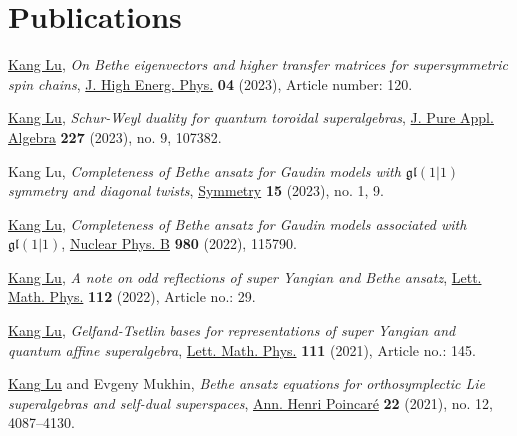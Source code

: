 \documentclass[11pt,letterpaper,roman%
]{moderncv}
\begin{document}
\section{Publications}

\begin{etaremune}[leftmargin=1cm]
\item \underline{Kang Lu}, {\textit{On Bethe eigenvectors and higher transfer matrices for supersymmetric spin chains}}, \href{https://doi.org/10.1007/JHEP04(2023)120}{J. High Energ. Phys.} \textbf{04} (2023), Article number: 120.

\item \underline{Kang Lu}, {\textit{Schur-Weyl duality for quantum toroidal superalgebras}}, \href{https://doi.org/10.1016/j.jpaa.2023.107382}{J. Pure Appl. Algebra} \textbf{227} (2023), no. 9, 107382.

\item Kang Lu, {\textit{Completeness of Bethe ansatz for Gaudin models with $\mathfrak{gl}(1|1)$
symmetry and diagonal twists}}, \href{https://www.mdpi.com/2073-8994/15/1/9}{Symmetry} \textbf{15} (2023), no. 1, 9.

\item \underline{Kang Lu}, {\textit{Completeness of Bethe ansatz for Gaudin models associated with} $\mathfrak{gl}(1|1)$}, \href{https://www.sciencedirect.com/science/article/pii/S0550321322001419}{Nuclear Phys. B} \textbf{980} (2022), 115790.

\item \underline{Kang Lu}, {\textit{A note on odd reflections of super Yangian and Bethe ansatz}}, \href{https://link.springer.com/article/10.1007/s11005-022-01524-3}{Lett. Math. Phys.} \textbf{112} (2022), Article no.: 29.

\item \underline{Kang Lu}, {\textit{Gelfand-Tsetlin bases for representations of super Yangian and quantum affine superalgebra}}, \href{https://link.springer.com/article/10.1007/s11005-021-01488-w}{Lett. Math. Phys.} \textbf{111} (2021), Article no.: 145.

\item \underline{Kang Lu} and Evgeny Mukhin, {\textit{Bethe ansatz equations for orthosymplectic Lie superalgebras and self-dual superspaces}}, \href{https://doi.org/10.1007/s00023-021-01091-8}{Ann. Henri Poincar\'{e}} \textbf{22} (2021), no. 12, 4087--4130.


\end{etaremune}
\end{document}

